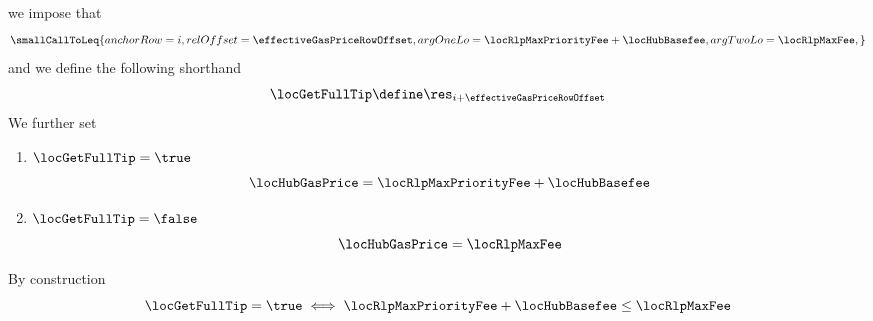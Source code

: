 \item[\underline{\underline{Row n$°(i + \effectiveGasPriceRowOffset)$: computing the effective gas price:}}]
	we impose that
	\[
		\smallCallToLeq {
			anchorRow = i ,
			relOffset = \effectiveGasPriceRowOffset  ,
			argOneLo  = \locRlpMaxPriorityFee + \locHubBasefee  ,
			argTwoLo  = \locRlpMaxFee  ,
		}
	\]
	and we define the following shorthand
	\[
		\locGetFullTip \define \res_{i + \effectiveGasPriceRowOffset}
	\]
	We further set
	\begin{enumerate}
		\item \If $\locGetFullTip = \true$  \Then
			\[
				\locHubGasPrice
				=
				\locRlpMaxPriorityFee + \locHubBasefee
			\]
		\item \If $\locGetFullTip = \false$ \Then
			\[
				\locHubGasPrice
				=
				\locRlpMaxFee
			\]
	\end{enumerate}
	\saNote{}
	By construction
	\[
		\locGetFullTip = \true \iff \locRlpMaxPriorityFee + \locHubBasefee \leq \locRlpMaxFee
	\]
